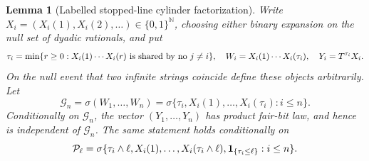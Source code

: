 \documentclass[11pt]{article}
\numberwithin{equation}{section}
\newtheorem{lemma}[theorem]{Lemma}
\newcommand{\1}{\mathbf 1}\newcommand{\F}{\mathcal F}\newcommand{\D}{\mathcal D}
\begin{document}
\begin{lemma}[Labelled stopped-line cylinder factorization]
\label{lem:res-suffix-factor}
Write $X_i=(X_i(1),X_i(2),\ldots)\in\{0,1\}^{\mathbb N}$, choosing either
binary expansion on the null set of dyadic rationals, and put
\[
 \tau_i=\min\{r\ge0:X_i(1)\cdots X_i(r)\hbox{ is shared by no }j\ne i\},
 \quad W_i=X_i(1)\cdots X_i(\tau_i),\quad Y_i=T^{\tau_i}X_i.
\]
On the null event that two infinite strings coincide define these objects
arbitrarily.  Let
\[
 \mathcal G_n=\sigma(W_1,\ldots,W_n)
 =\sigma\{\tau_i,X_i(1),\ldots,X_i(\tau_i):i\le n\}.
\]
Conditionally on $\mathcal G_n$, the vector $(Y_1,\ldots,Y_n)$ has product
fair-bit law, and hence is independent of $\mathcal G_n$.  The same statement
holds conditionally on
\[
 \mathcal P_\ell=\sigma\{\tau_i\wedge\ell,
 X_i(1),\ldots,X_i(\tau_i\wedge\ell),
 {\bf1}_{\{\tau_i\le\ell\}}:i\le n\}.
\]
\end{lemma}
\end{document}
